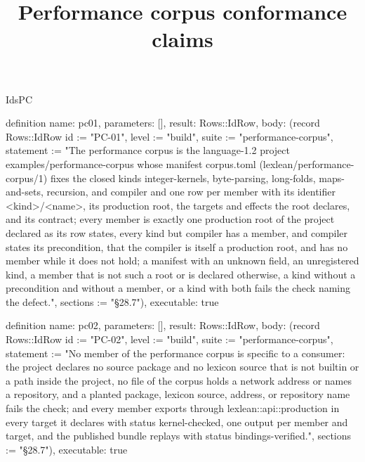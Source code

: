 \begin{lexlean}{IdsPC}
\title{Performance corpus conformance claims}
\begin{semanticmodule}
definition{
  name: pc01,
  parameters: [],
  result: Rows::IdRow,
  body: (record Rows::IdRow {id := "PC-01", level := "build", suite := "performance-corpus", statement := "The performance corpus is the language-1.2 project examples/performance-corpus whose manifest corpus.toml (lexlean/performance-corpus/1) fixes the closed kinds integer-kernels, byte-parsing, long-folds, maps-and-sets, recursion, and compiler and one row per member with its identifier <kind>/<name>, its production root, the targets and effects the root declares, and its contract; every member is exactly one production root of the project declared as its row states, every kind but compiler has a member, and compiler states its precondition, that the compiler is itself a production root, and has no member while it does not hold; a manifest with an unknown field, an unregistered kind, a member that is not such a root or is declared otherwise, a kind without a precondition and without a member, or a kind with both fails the check naming the defect.", sections := "§28.7"}),
  executable: true
}

definition{
  name: pc02,
  parameters: [],
  result: Rows::IdRow,
  body: (record Rows::IdRow {id := "PC-02", level := "build", suite := "performance-corpus", statement := "No member of the performance corpus is specific to a consumer: the project declares no source package and no lexicon source that is not builtin or a path inside the project, no file of the corpus holds a network address or names a repository, and a planted package, lexicon source, address, or repository name fails the check; and every member exports through lexlean::api::production in every target it declares with status kernel-checked, one output per member and target, and the published bundle replays with status bindings-verified.", sections := "§28.7"}),
  executable: true
}
\end{semanticmodule}
\end{lexlean}
